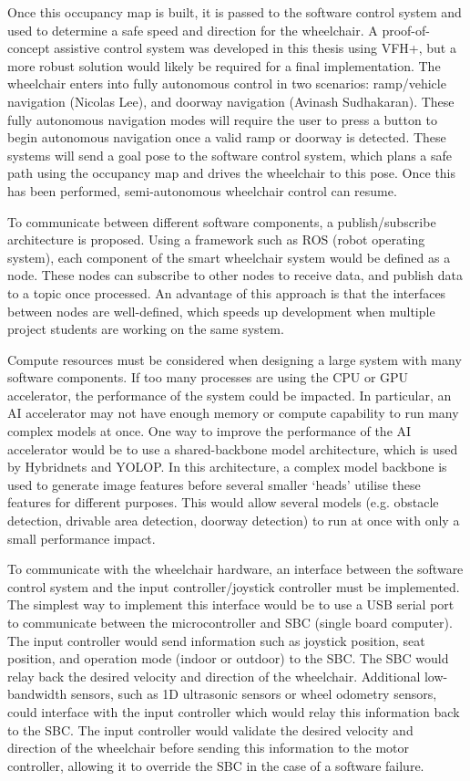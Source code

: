 Once this occupancy map is built, it is passed to the software control system and used to determine
a safe speed and direction for the wheelchair.
A proof-of-concept assistive control system was developed in this thesis using VFH+,
but a more robust solution would likely be required for a final implementation. The wheelchair enters into fully autonomous control
in two scenarios: ramp/vehicle navigation (Nicolas Lee),
and doorway navigation (Avinash Sudhakaran). These fully autonomous navigation modes will require the user to
press a button to begin autonomous navigation once a valid ramp or doorway is detected.
These systems will send a goal pose to the software control system, which plans a safe path
using the occupancy map and drives the wheelchair to this pose. Once this has been performed,
semi-autonomous wheelchair control can resume.

To communicate between different software components, a publish/subscribe architecture
is proposed. Using a framework such as ROS (robot operating system), each component of the smart wheelchair system would
be defined as a node. These nodes can subscribe to other nodes to receive data,
and publish data to a topic once processed. An advantage of this approach is that the interfaces between nodes
are well-defined, which speeds up development when multiple project students
are working on the same system.

Compute resources must be considered when designing a large system with many software components.
If too many processes are using the CPU or GPU accelerator, the performance of the system
could be impacted. In particular, an AI accelerator may not have enough memory or compute capability to run many complex
models at once. One way to improve the performance of the AI accelerator would be to use a shared-backbone model
architecture, which is used by Hybridnets and YOLOP. In this architecture, a complex model backbone
is used to generate image features before several smaller `heads' utilise these features for different purposes.
This would allow several models (e.g. obstacle detection, drivable area detection, doorway detection)
to run at once with only a small performance impact.

To communicate with the wheelchair hardware, an interface between the software control system and the
input controller/joystick controller must be implemented. The simplest way to implement this
interface would be to use a USB serial port to communicate between the microcontroller and
SBC (single board computer).
The input controller would send information such as joystick position,
seat position, and operation mode (indoor or outdoor) to the SBC. The SBC would relay back the
desired velocity and direction of the wheelchair. Additional low-bandwidth sensors, such as
1D ultrasonic sensors or wheel odometry sensors, could interface with the input controller
which would relay this information back to the SBC. The input controller would validate
the desired velocity and direction of the wheelchair before sending this information
to the motor controller, allowing it to override the SBC in the case of a software failure.

